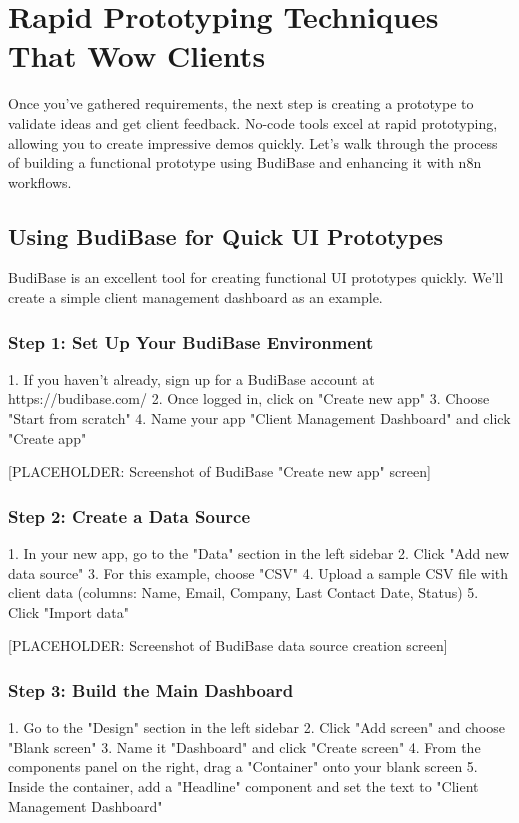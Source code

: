 \section{Rapid Prototyping Techniques That Wow Clients}

Once you've gathered requirements, the next step is creating a prototype to validate ideas and get client feedback. No-code tools excel at rapid prototyping, allowing you to create impressive demos quickly. Let's walk through the process of building a functional prototype using BudiBase and enhancing it with n8n workflows.

\subsection{Using BudiBase for Quick UI Prototypes}

BudiBase is an excellent tool for creating functional UI prototypes quickly. We'll create a simple client management dashboard as an example.

\subsubsection{Step 1: Set Up Your BudiBase Environment}

1. If you haven't already, sign up for a BudiBase account at https://budibase.com/
2. Once logged in, click on "Create new app"
3. Choose "Start from scratch"
4. Name your app "Client Management Dashboard" and click "Create app"

[PLACEHOLDER: Screenshot of BudiBase "Create new app" screen]

\subsubsection{Step 2: Create a Data Source}

1. In your new app, go to the "Data" section in the left sidebar
2. Click "Add new data source"
3. For this example, choose "CSV"
4. Upload a sample CSV file with client data (columns: Name, Email, Company, Last Contact Date, Status)
5. Click "Import data"

[PLACEHOLDER: Screenshot of BudiBase data source creation screen]

\subsubsection{Step 3: Build the Main Dashboard}

1. Go to the "Design" section in the left sidebar
2. Click "Add screen" and choose "Blank screen"
3. Name it "Dashboard" and click "Create screen"
4. From the components panel on the right, drag a "Container" onto your blank screen
5. Inside the container, add a "Headline" component and set the text to "Client Management Dashboard"

